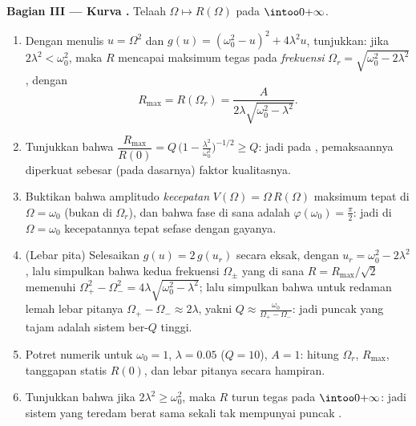 \begin{problem}
\medskip
\noindent\textbf{Bagian III --- Kurva .} Telaah
$\Omega \mapsto R(\Omega)$ pada $\intoo0{+\infty}$.
\begin{enumerate}[resume]
  \item Dengan menulis $u = \Omega^2$ dan $g(u) = (\omega_0^2 - u)^2 +
        4\lambda^2 u$, tunjukkan: jika $2\lambda^2 < \omega_0^2$, maka $R$
        mencapai maksimum tegas pada \emph{frekuensi }
        $\Omega_r = \sqrt{\omega_0^2 - 2\lambda^2}$, dengan
        \[
        R_{\max} = R(\Omega_r)
        = \frac{A}{2\lambda\sqrt{\omega_0^2 - \lambda^2}} .
        \]
  \item Tunjukkan bahwa $\dfrac{R_{\max}}{R(0)} = Q\,\bigl(1 -
        \tfrac{\lambda^2}{\omega_0^2}\bigr)^{-1/2} \geq Q$: jadi pada
        , pemaksaannya diperkuat sebesar (pada dasarnya) faktor
        kualitasnya.
  \item Buktikan bahwa amplitudo \emph{kecepatan} $V(\Omega) =
        \Omega\,R(\Omega)$ maksimum tepat di $\Omega =
        \omega_0$ (bukan di $\Omega_r$), dan bahwa fase di sana adalah
        $\varphi(\omega_0) = \frac\pi2$: jadi di $\Omega = \omega_0$
        kecepatannya tepat sefase dengan gayanya.
  \item (Lebar pita) Selesaikan $g(u) = 2\,g(u_r)$ secara eksak, dengan $u_r =
        \omega_0^2 - 2\lambda^2$, lalu simpulkan bahwa kedua
        frekuensi $\Omega_\pm$ yang di sana $R = R_{\max}/\sqrt2$
        memenuhi $\Omega_+^2 - \Omega_-^2 =
        4\lambda\sqrt{\omega_0^2 - \lambda^2}$; lalu simpulkan bahwa untuk
        redaman lemah lebar pitanya $\Omega_+ - \Omega_-
        \approx 2\lambda$, yakni $Q \approx
        \frac{\omega_0}{\Omega_+ - \Omega_-}$: jadi puncak 
        yang tajam adalah sistem ber-$Q$ tinggi.
  \item Potret numerik untuk $\omega_0 = 1$, $\lambda = 0.05$
        ($Q = 10$), $A = 1$: hitung $\Omega_r$, $R_{\max}$,
        tanggapan statis $R(0)$, dan lebar pitanya secara hampiran.
  \item Tunjukkan bahwa jika $2\lambda^2 \geq \omega_0^2$, maka $R$
        turun tegas pada $\intoo0{+\infty}$: jadi sistem yang teredam
        berat sama sekali tak mempunyai puncak .
\end{enumerate}


\end{problem}
